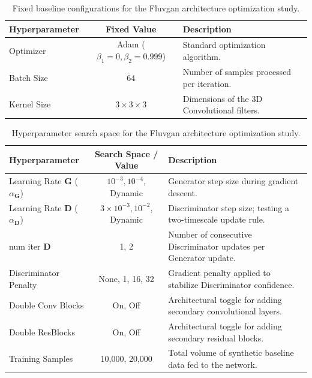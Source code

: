 \begin{table}[htbp!]
    \centering
    \renewcommand{\arraystretch}{1.3}
    \begin{tabular}{@{} l c p{} @{}}
        \hline
        \textbf{Hyperparameter} & \textbf{Fixed Value} & \textbf{Description} \\
        \hline
        Optimizer & Adam ($\beta_1=0, \beta_2=0.999$) & Standard optimization algorithm. \\
        Batch Size & 64 & Number of samples processed per iteration. \\
        Kernel Size & $3 \times 3 \times 3$ & Dimensions of the 3D Convolutional filters. \\
        \hline
    \end{tabular}
    \caption{Fixed baseline configurations for the Fluvgan architecture optimization study.}
    \label{tab:fixed_baseline_config}
\end{table}

\begin{table}[htbp!]
    \centering
    \renewcommand{\arraystretch}{1.3}
    \begin{tabular}{@{} l c p{} @{}}
        \hline
        \textbf{Hyperparameter} & \textbf{Search Space / Value} & \textbf{Description} \\
        \hline
        Learning Rate $\mathbf{G}$ ($\alpha_{\mathbf{G}}$) & $10^{-3}, 10^{-4}$, Dynamic & Generator step size during gradient descent. \\
        Learning Rate $\mathbf{D}$ ($\alpha_{\mathbf{D}}$) & $3\times10^{-3}, 10^{-2}$, Dynamic & Discriminator step size; testing a two-timescale update rule. \\
        num iter $\mathbf{D}$ & 1, 2 & Number of consecutive Discriminator updates per Generator update. \\
        Discriminator Penalty & None, 1, 16, 32 & Gradient penalty applied to stabilize Discriminator confidence. \\
        Double Conv Blocks & On, Off & Architectural toggle for adding secondary convolutional layers. \\
        Double ResBlocks & On, Off & Architectural toggle for adding secondary residual blocks. \\
        Training Samples & 10,000, 20,000 & Total volume of synthetic baseline data fed to the network. \\
        \hline
    \end{tabular}
    \caption{Hyperparameter search space for the Fluvgan architecture optimization study.}
    \label{tab:Hyperparameter_search_space}
\end{table}


